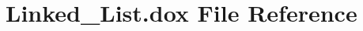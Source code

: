 \hypertarget{_linked___list_8dox}{}\section{Linked\+\_\+\+List.\+dox File Reference}
\label{_linked___list_8dox}

